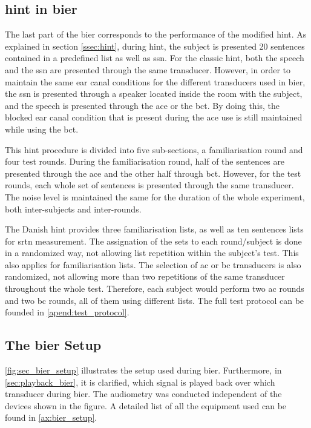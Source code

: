 \subsection{\gls{hint} in \gls{bier}}
The last part of the \gls{bier} corresponds to the performance of the modified \gls{hint}. As explained in section \autoref{ssec:hint}, during \gls{hint}, the subject is presented 20 sentences contained in a predefined list as well as \gls{ssn}. For the classic \gls{hint}, both the speech and the \gls{ssn} are presented through the same transducer. However, in order to maintain the same ear canal conditions for the different transducers used in \gls{bier}, the \gls{ssn} is presented through a speaker located inside the room with the subject, and the speech is presented through the  \gls{ace} or the \gls{bct}. By doing this, the blocked ear canal condition that is present during the \gls{ace} use is still maintained while using the \gls{bct}.

This \gls{hint} procedure is divided into five sub-sections, a familiarisation round and four test rounds. During the familiarisation round, half of the sentences are presented through the \gls{ace} and the other half through \gls{bct}. However, for the test rounds, each whole set of sentences is presented through the same transducer. The noise level is maintained the same for the duration of the whole experiment, both inter-subjects and inter-rounds.

The Danish \gls{hint} provides three familiarisation lists, as well as ten sentences lists for \gls{srtn} measurement. The assignation of the sets to each round/subject is done in a randomized way, not allowing list repetition within the subject's test. This also applies for familiarisation lists. The selection of \gls{ac} or \gls{bc} transducers is also randomized, not allowing more than two repetitions of the same transducer throughout the whole test. Therefore, each subject would perform two \gls{ac} rounds and two \gls{bc} rounds, all of them using different lists. The full test protocol can be founded in \autoref{apend:test_protocol}.


\subsection{The \gls{bier} Setup}
\autoref{fig:sec_bier_setup} illustrates the setup used during \gls{bier}. Furthermore, in \autoref{sec:playback_bier}, it is clarified, which signal is played back over which transducer during \gls{bier}. The audiometry was conducted independent of the devices shown in the figure. A detailed list of all the equipment used can be found in \autoref{ax:bier_setup}. 

